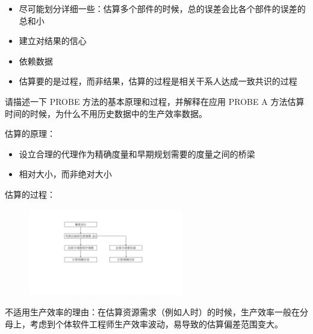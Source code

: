 \begin{solution}
\vspace{-0.8em}
\begin{multicols}{2}
    \begin{itemize}
        \item 尽可能划分详细一些：估算多个部件的时候，总的误差会比各个部件的误差的总和小
        \item 建立对结果的信心
        \item 依赖数据
        \item 估算要的是过程，而非结果，估算的过程是相关干系人达成一致共识的过程
    \end{itemize}
\end{multicols}
\vspace{-1em}
\end{solution}



\begin{problem}[2018、2020]
请描述一下 PROBE 方法的基本原理和过程，并解释在应用 PROBE A 方法估算时间的时候，为什么不用历史数据中的生产效率数据。
\end{problem}

\begin{solution}
估算的原理：
\begin{itemize}
    \item 设立合理的代理作为精确度量和早期规划需要的度量之间的桥梁
    \item 相对大小，而非绝对大小
\end{itemize}

估算的过程：

\begin{figure}[H]
	\centering
	\includegraphics[width=0.6\textwidth]{估算过程.pdf}
\end{figure}

不适用生产效率的理由：在估算资源需求（例如人时）的时候，生产效率一般在分母上，考虑到个体软件工程师生产效率波动，易导致的估算偏差范围变大。
\end{solution}



